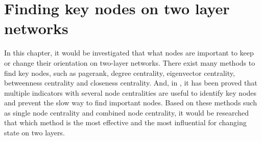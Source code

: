 
\chapter{Finding key nodes on two layer networks}
\label{chap:finding key nodes on two layer networks}
In this chapter, it would be investigated that what nodes are important to keep or change their orientation on two-layer networks. There exist many methods to find key nodes, such as pagerank, degree centrality, eigenvector centrality, betweenness centrality and closeness centrality. And, in \parencite{mesgari2015, huang2014}, it has been proved that multiple indicators with several node centralities are useful to identify key nodes and prevent the slow way to find important nodes. Based on these methods such as single node centrality and combined node centrality, it would be researched that which method is the most effective and the most influential for changing state on two layers.  


